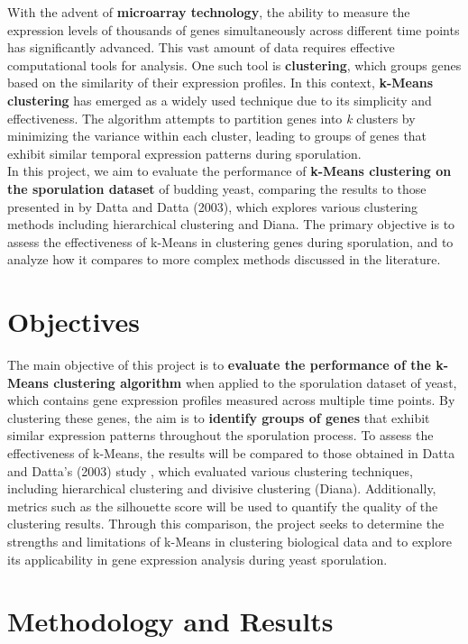 \documentclass{article}
\begin{document}
With the advent of \textbf{microarray technology}, the ability to measure the expression levels of thousands of genes simultaneously across different time points has significantly advanced. This vast amount of data requires effective computational tools for analysis. One such tool is \textbf{clustering}, which groups genes based on the similarity of their expression profiles. In this context, \textbf{k-Means clustering} has emerged as a widely used technique due to its simplicity and effectiveness. The algorithm attempts to partition genes into
\emph{k} clusters by minimizing the variance within each cluster, leading to groups of genes that exhibit similar temporal expression patterns during sporulation.
\\

In this project, we aim to evaluate the performance of \textbf{k-Means clustering on the sporulation dataset} of budding yeast, comparing the results to those presented in  by Datta and Datta (2003)\cite{Datta2003}, which explores various clustering methods including hierarchical clustering and Diana. The primary objective is to assess the effectiveness of k-Means in clustering genes during sporulation, and to analyze how it compares to more complex methods discussed in the literature.

\section{Objectives}
The main objective of this project is to \textbf{evaluate the performance of the k-Means clustering algorithm} when applied to the sporulation dataset of yeast, which contains gene expression profiles measured across multiple time points. By clustering these genes, the aim is to \textbf{identify groups of genes} that exhibit similar expression patterns throughout the sporulation process. To assess the effectiveness of k-Means, the results will be compared to those obtained in Datta and Datta's (2003) study \cite{Datta2003}, which evaluated various clustering techniques, including hierarchical clustering and divisive clustering (Diana). Additionally, metrics such as the silhouette score will be used to quantify the quality of the clustering results. Through this comparison, the project seeks to determine the strengths and limitations of k-Means in clustering biological data and to explore its applicability in gene expression analysis during yeast sporulation.
	
	
\section{Methodology and Results}
\end{document}
